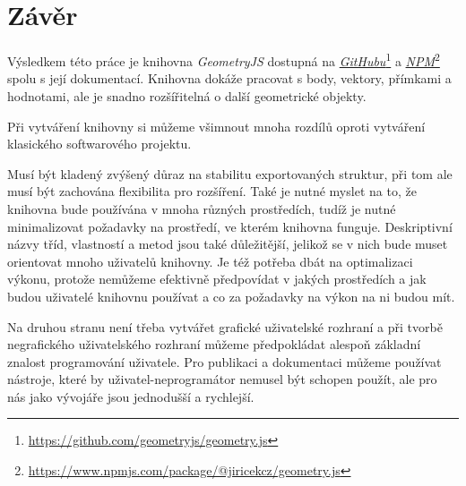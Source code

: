 \chapter{Závěr}
\label{chap:conclusion}

Výsledkem této práce je knihovna \textit{GeometryJS} dostupná na \textit{\hyperlink{https://github.com/geometryjs/geometry.js}{GitHubu}}\footnote{\url{https://github.com/geometryjs/geometry.js}} a \textit{\hyperlink{https://www.npmjs.com/package/@jiricekcz/geometry.js}{NPM}}\footnote{\url{https://www.npmjs.com/package/@jiricekcz/geometry.js}} spolu s její dokumentací.
Knihovna dokáže pracovat s body, vektory, přímkami a hodnotami, ale je snadno rozšířitelná o další geometrické objekty.

Při vytváření knihovny si můžeme všimnout mnoha rozdílů oproti vytváření klasického softwarového projektu.

Musí být kladený zvýšený důraz na stabilitu exportovaných struktur, při tom ale musí být zachována flexibilita pro rozšíření.
Také je nutné myslet na to, že knihovna bude používána v mnoha různých prostředích, tudíž je nutné minimalizovat požadavky na prostředí, ve kterém knihovna funguje.
Deskriptivní názvy tříd, vlastností a metod jsou také důležitější, jelikož se v nich bude muset orientovat mnoho uživatelů knihovny.
Je též potřeba dbát na optimalizaci výkonu, protože nemůžeme efektivně předpovídat v jakých prostředích a jak budou uživatelé knihovnu používat a co za požadavky na výkon na ni budou mít.

Na druhou stranu není třeba vytvářet grafické uživatelské rozhraní a při tvorbě negrafického uživatelského rozhraní můžeme předpokládat alespoň základní znalost programování uživatele.
Pro publikaci a dokumentaci můžeme používat nástroje, které by uživatel-neprogramátor nemusel být schopen použít, ale pro nás jako vývojáře jsou jednodušší a rychlejší.

